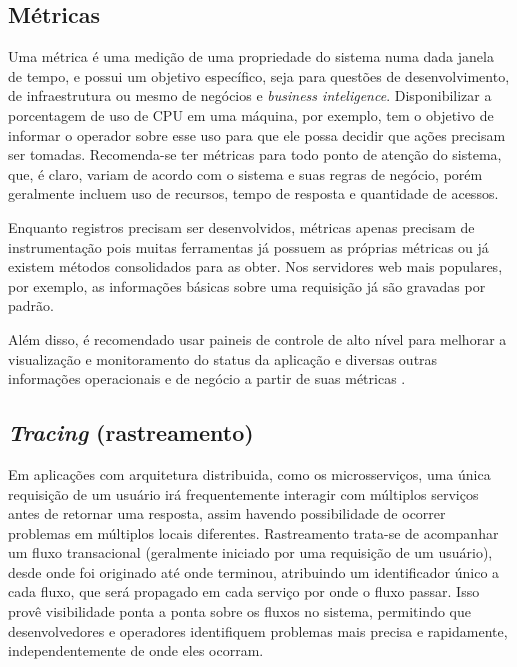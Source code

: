 
\subsection{Métricas}
Uma métrica é uma medição de uma propriedade do sistema numa dada janela de tempo, e possui um objetivo específico, seja para questões de desenvolvimento, de infraestrutura ou mesmo de negócios e \emph{business inteligence}. Disponibilizar a porcentagem de uso de CPU em uma máquina, por exemplo, tem o objetivo de informar o operador sobre esse uso para que ele possa decidir que ações precisam ser tomadas. Recomenda-se ter métricas para todo ponto de atenção do sistema, que, é claro, variam de acordo com o sistema e suas regras de negócio, porém geralmente incluem uso de recursos, tempo de resposta e quantidade de acessos.

Enquanto registros precisam ser desenvolvidos, métricas apenas precisam de instrumentação pois muitas ferramentas já possuem as próprias métricas ou já existem métodos consolidados para as obter. Nos servidores web mais populares, por exemplo, as informações básicas sobre uma requisição já são gravadas por padrão.

Além disso, é recomendado usar paineis de controle de alto nível para melhorar a visualização e monitoramento do status da aplicação e diversas outras informações operacionais e de negócio a partir de suas métricas \cite{martin-fowler-microservices}.

\subsection{\emph{Tracing} (rastreamento)}
Em aplicações com arquitetura distribuida, como os microsserviços, uma única requisição de um usuário irá frequentemente interagir com múltiplos serviços antes de retornar uma resposta, assim havendo possibilidade de ocorrer problemas em múltiplos locais diferentes. Rastreamento trata-se de acompanhar um fluxo transacional (geralmente iniciado por uma requisição de um usuário), desde onde foi originado até onde terminou, atribuindo um identificador único a cada fluxo, que será propagado em cada serviço por onde o fluxo passar. Isso provê visibilidade ponta a ponta sobre os fluxos no sistema, permitindo que desenvolvedores e operadores identifiquem problemas mais precisa e rapidamente, independentemente de onde eles ocorram. 

